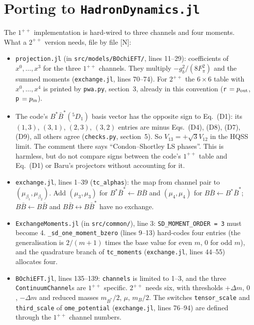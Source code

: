 \documentclass[11pt,a4paper]{article}
\newcommand{\tagN}{\textcolor{red!70!black}{\textsf{\small[N]}}}
\newcommand{\BB}{B\bar B}
\newcommand{\BBst}{B\bar B^*}
\newcommand{\BstBst}{B^*\bar B^*}
\begin{document}
\section{Porting to \texttt{HadronDynamics.jl}}
\label{sec:code}

{\sloppy
The $1^{++}$ implementation is hard-wired to three channels and four moments. What a $2^{++}$ version needs, file by file \tagN:
\begin{itemize}
\item \texttt{projection.jl} (in \texttt{src/models/BOchiEFT/}, lines 11--29): coefficients of $x^0,\dots,x^3$ for the three $1^{++}$ channels. They multiply $-g_b^2/(8F_\pi^2)$ and the summed moments (\texttt{exchange.jl}, lines 70--74). For $2^{++}$ the $6\times6$ table with $x^0,\dots,x^4$ is printed by \texttt{pwa.py}, section~3, already in this convention (\texttt{r} $=p_{\rm out}$, \texttt{p} $=p_{\rm in}$).
\item The code's $\BstBst(^5D_1)$ basis vector has the opposite sign to Eq.~(D1): its $(1,3)$, $(3,1)$, $(2,3)$, $(3,2)$ entries are minus Eqs.~(D4), (D8), (D7), (D9), all others agree (\texttt{checks.py}, section~5). So $V_{13}=+\sqrt3V_{12}$ in the HQSS limit. The comment there says ``Condon--Shortley LS phases''. This is harmless, but do not compare signs between the code's $1^{++}$ table and Eq.~(D1) or Baru's projectors without accounting for it.
\item \texttt{exchange.jl}, lines 1--39 (\texttt{tc\_alphas}): the map from channel pair to $(\mu_{\beta_1},\mu_{\beta_2})$. Add $(\mu_3,\mu_3)$ for $\BstBst\leftarrow\BB$ and $(\mu_4,\mu_4)$ for $\BB\leftarrow\BstBst$; $\BB\leftarrow\BB$ and $\BB\leftrightarrow\BBst$ have no exchange.
\item \texttt{ExchangeMoments.jl} (in \texttt{src/common/}), line 3: \texttt{SD\_MOMENT\_ORDER = 3} must become 4. \texttt{\_sd\_one\_moment\_bzero} (lines 9--13) hard-codes four entries (the generalisation is $2/(m+1)$ times the base value for even $m$, 0 for odd $m$), and the quadrature branch of \texttt{tc\_moments} (\texttt{exchange.jl}, lines 44--55) allocates four.
\item \texttt{BOchiEFT.jl}, lines 135--139: \texttt{channels} is limited to 1--3, and the three \texttt{ContinuumChannel}s are $1^{++}$ specific. $2^{++}$ needs six, with thresholds $+\Delta m$, $0$, $-\Delta m$ and reduced masses $m_{B^*}/2$, $\mu$, $m_B/2$. The switches \texttt{tensor\_scale} and \texttt{third\_scale} of \texttt{ome\_potential} (\texttt{exchange.jl}, lines 76--94) are defined through the $1^{++}$ channel numbers.
\end{itemize}
\par}
\end{document}
